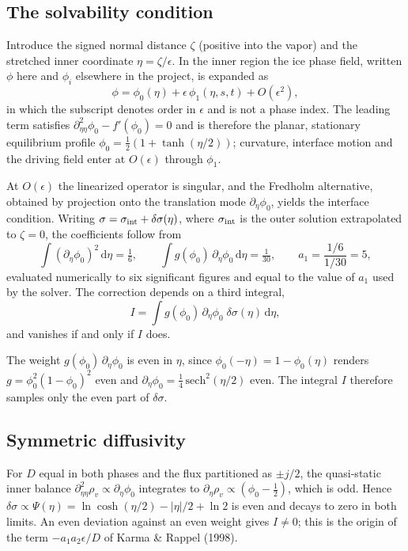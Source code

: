 \subsection{The solvability condition}
Introduce the signed normal distance $\zeta$ (positive into the vapor) and the stretched
inner coordinate $\eta=\zeta/\epsilon$. In the inner region the ice phase field, written
$\phi$ here and $\phi_i$ elsewhere in the project, is expanded as
\begin{equation}
\phi=\phi_0(\eta)+\epsilon\,\phi_1(\eta,s,t)+O(\epsilon^2),
\end{equation}
in which the subscript denotes order in $\epsilon$ and is not a phase index. The leading
term satisfies $\partial^2_{\eta\eta}\phi_0-f'(\phi_0)=0$ and is therefore the planar,
stationary equilibrium profile $\phi_0=\tfrac12\left(1+\tanh(\eta/2)\right)$; curvature,
interface motion and the driving field enter at $O(\epsilon)$ through $\phi_1$.

At $O(\epsilon)$ the linearized operator is singular, and the Fredholm alternative,
obtained by projection onto the translation mode $\partial_\eta\phi_0$, yields the
interface condition. Writing $\sigma=\sigma_{\rm int}+\delta\sigma(\eta)$, where
$\sigma_{\rm int}$ is the outer solution extrapolated to $\zeta=0$, the coefficients follow
from
\begin{equation}
\int(\partial_\eta\phi_0)^2\,\mathrm{d}\eta=\tfrac16,\qquad
\int g(\phi_0)\,\partial_\eta\phi_0\,\mathrm{d}\eta=\tfrac1{30},\qquad
a_1=\frac{1/6}{1/30}=5 ,
\end{equation}
evaluated numerically to six significant figures and equal to the value of $a_1$ used by
the solver. The correction depends on a third integral,
\begin{equation}
I=\int g(\phi_0)\,\partial_\eta\phi_0\;\delta\sigma(\eta)\,\mathrm{d}\eta ,
\label{eq:Iint}
\end{equation}
and vanishes if and only if $I$ does.

The weight $g(\phi_0)\,\partial_\eta\phi_0$ is even in $\eta$, since
$\phi_0(-\eta)=1-\phi_0(\eta)$ renders $g=\phi_0^2(1-\phi_0)^2$ even and
$\partial_\eta\phi_0=\tfrac14\,\mathrm{sech}^2(\eta/2)$ even. The integral $I$ therefore
samples only the even part of $\delta\sigma$.

\subsection{Symmetric diffusivity}
For $D$ equal in both phases and the flux partitioned as $\pm j/2$, the quasi-static inner
balance $\partial^2_{\eta\eta}\rho_v\propto\partial_\eta\phi_0$ integrates to
$\partial_\eta\rho_v\propto(\phi_0-\tfrac12)$, which is odd. Hence
$\delta\sigma\propto\Psi(\eta)=\ln\cosh(\eta/2)-|\eta|/2+\ln2$ is even and decays to zero
in both limits. An even deviation against an even weight gives $I\neq0$; this is the
origin of the term $-a_1a_2\epsilon/D$ of Karma \& Rappel (1998).

